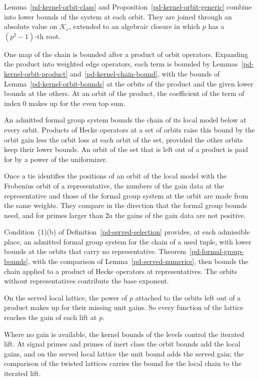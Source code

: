 Lemma~\ref{pd-kernel-orbit-class} and Proposition~\ref{pd-kernel-orbit-generic} combine into lower bounds
of the system at each orbit. They are joined through an absolute value on $\mathcal K_c$, extended to an
algebraic closure in which $p$ has a $(p^2-1)$-th root.

One map of the chain is bounded after a product of orbit operators. Expanding the product into weighted
edge operators, each term is bounded by Lemmas~\ref{pd-kernel-orbit-product}
and~\ref{pd-kernel-chain-bound}, with the bounds of Lemma~\ref{pd-kernel-orbit-bounds} at the orbits of
the product and the given lower bounds at the others. At an orbit of the product, the coefficient of the
term of index $0$ makes up for the even top sum.

An admitted formal group system bounds the chain of its local model below at every orbit. Products
of Hecke operators at a set of orbits raise this bound by the orbit gain less the orbit loss at each
orbit of the set, provided the other orbits keep their lower bounds. An orbit of the set that is
left out of a product is paid for by a power of the uniformizer.

Once a tie identifies the positions of an orbit of the local model with the Frobenius orbit of a
representative, the numbers of the gain data at the representative and those of the formal group
system at the orbit are made from the same weights. They compare in the direction that the formal
group bounds need, and for primes larger than $2a$ the gains of the gain data are not positive.

Condition~(1)(b) of Definition~\ref{pd-served-selection} provides, at each admissible place, an
admitted formal group system for the chain of a used tuple, with lower bounds at the orbits that
carry no representative. Theorem~\ref{pd-formal-group-bounds}, with the comparison of
Lemma~\ref{pd-served-numerics}, then bounds the chain applied to a product of Hecke operators at
representatives. The orbits without representatives contribute the base exponent.

On the served local lattice, the power of $p$ attached to the orbits left out of a product makes up
for their missing unit gains. So every function of the lattice reaches the gain of each lift at
$p$.

Where no gain is available, the kernel bounds of the levels control the iterated lift. At signal
primes and primes of inert class the orbit bounds add the local gains, and on the served local
lattice the unit bound adds the served gain; the comparison of the twisted lattices carries the
bound for the local chain to the iterated lift.

